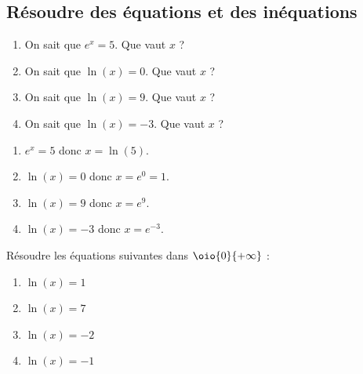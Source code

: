 \documentclass[a4paper,11pt,exos]{nsi} %
\begin{document}
\subsection*{Résoudre des équations et des inéquations}
\exo{}
\begin{multicols}{2}
    \begin{enumerate}
        \item On sait que $e^x=5$. Que vaut $x$ ?
        \item On sait que $\ln(x)=0$. Que vaut $x$ ?
        \item On sait que $\ln(x)=9$. Que vaut $x$ ?
        \item On sait que $\ln(x)=-3$. Que vaut $x$ ?
    \end{enumerate}
    
    \textcolor{UGLiBlue}{
        \begin{enumerate}
            \item $e^x=5$ donc $x=\ln(5)$.
            \item $\ln(x)=0$ donc $x=e^0=1$.
            \item $\ln(x)=9$ donc $x=e^9$.
            \item $\ln(x)=-3$ donc $x=e^{-3}$.
        \end{enumerate}
    }
\end{multicols}


\exo{}
Résoudre les équations suivantes dans $\oio{0}{+\infty}$ :
\begin{multicols}{4}
    \begin{enumerate}
        \item $\ln(x)=1$
        \item $\ln(x)=7$
        \item $\ln(x)=-2$
        \item $\ln(x)=-1$
    \end{enumerate}
\end{multicols}
\end{document}
